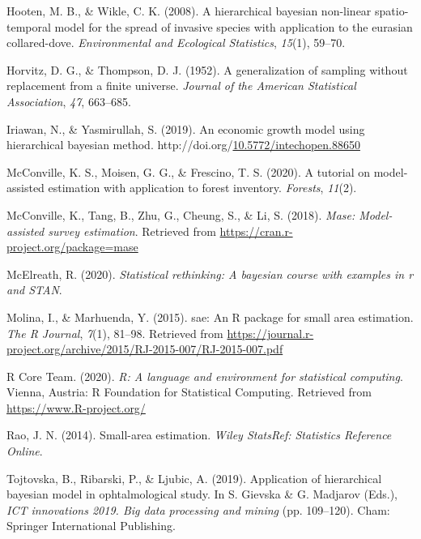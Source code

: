 \documentclass[12pt,twoside]{reedthesis}
\newlength{\cslhangindent}
\newenvironment{CSLReferences}[2] %
 {%
  \setlength{\parindent}{0pt}
  \ifodd #1 \everypar{\setlength{\hangindent}{\cslhangindent}}\ignorespaces\fi
  \ifnum #2 > 0
  \setlength{\parskip}{#2\baselineskip}
  \fi
 }%
 {}
\begin{document}
\begin{CSLReferences}{1}{0}
\leavevmode{}%
Hooten, M. B., \& Wikle, C. K. (2008). A hierarchical bayesian non-linear spatio-temporal model for the spread of invasive species with application to the eurasian collared-dove. \emph{Environmental and Ecological Statistics}, \emph{15}(1), 59--70.

\leavevmode{}%
Horvitz, D. G., \& Thompson, D. J. (1952). A generalization of sampling without replacement from a finite universe. \emph{Journal of the American Statistical Association}, \emph{47}, 663--685.

\leavevmode{}%
Iriawan, N., \& Yasmirullah, S. (2019). An economic growth model using hierarchical bayesian method. http://doi.org/\href{https://doi.org/10.5772/intechopen.88650}{10.5772/intechopen.88650}

\leavevmode{}%
McConville, K. S., Moisen, G. G., \& Frescino, T. S. (2020). A tutorial on model-assisted estimation with application to forest inventory. \emph{Forests}, \emph{11}(2).

\leavevmode{}%
McConville, K., Tang, B., Zhu, G., Cheung, S., \& Li, S. (2018). \emph{Mase: Model-assisted survey estimation}. Retrieved from \url{https://cran.r-project.org/package=mase}

\leavevmode{}%
McElreath, R. (2020). \emph{Statistical rethinking: A bayesian course with examples in r and STAN}.

\leavevmode{}%
Molina, I., \& Marhuenda, Y. (2015). {sae}: An {R} package for small area estimation. \emph{The R Journal}, \emph{7}(1), 81--98. Retrieved from \url{https://journal.r-project.org/archive/2015/RJ-2015-007/RJ-2015-007.pdf}

\leavevmode{}%
R Core Team. (2020). \emph{R: A language and environment for statistical computing}. Vienna, Austria: R Foundation for Statistical Computing. Retrieved from \url{https://www.R-project.org/}

\leavevmode{}%
Rao, J. N. (2014). Small-area estimation. \emph{Wiley StatsRef: Statistics Reference Online}.

\leavevmode{}%
Tojtovska, B., Ribarski, P., \& Ljubic, A. (2019). Application of hierarchical bayesian model in ophtalmological study. In S. Gievska \& G. Madjarov (Eds.), \emph{ICT innovations 2019. Big data processing and mining} (pp. 109--120). Cham: Springer International Publishing.


\end{CSLReferences}
\end{document}
